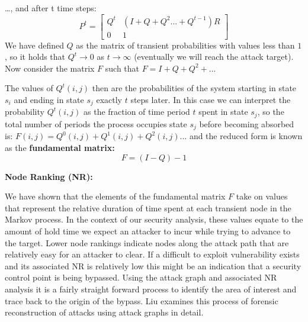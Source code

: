  
 …, and after t time steps: 
 \[
P^t=
\begin{bmatrix}
Q^t & (I + Q +Q^2 ... +Q^{t-1}) R \\
0 & 1
\end{bmatrix}
\]
 We have defined \(Q\) as the matrix of transient probabilities with values less than \(1\), so it holds that \(Q^t \to 0\) as \(t \to \infty\)
(eventually we will reach the attack target). Now consider the matrix  \(F\) such that \( F= I + Q + Q^2 +...\)

The values of \(Q^t(i,j)\)  then are the probabilities of the system starting in state \(s_i\) and ending in state \(s_j\) exactly \(t\) steps later. In this case we can interpret the probability \(Q^t(i,j)\)
  as the fraction of time period \(t\) spent in state \(s_j\), so the total number of periods the process occupies state \(s_j\) before becoming absorbed is:  \(F(i, j) = Q^0(i,j)+Q^1(i,j)+Q^2(i,j)...\) and the reduced form is known as the \textbf{fundamental matrix:}
\[ F = (I-Q)-1\] 








\textbf{Node Ranking (NR):  }

We have shown that the elements of the fundamental matrix \(F\) take on values that represent the relative duration of time spent at each transient node in the Markov process. In the context of our security analysis, these values equate to the amount of hold time we expect an attacker to incur while trying to advance to the target. Lower node rankings indicate nodes along the attack path that are relatively easy for an attacker to clear. If a difficult to exploit vulnerability exists and its associated NR is relatively low this might be an indication that a security control point is being bypassed. Using the attack graph and associated NR analysis it is a fairly straight forward process to identify the area of interest and trace back to the origin of the bypass. Liu\cite{Liu_Singhal_Wijesekera} examines this process of forensic reconstruction of attacks using attack graphs in detail.


